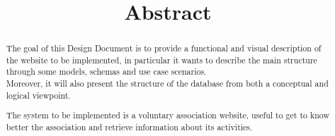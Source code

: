\documentclass[../DD.tex]{subfiles}
\begin{document}
\title{Abstract}
\begin{abstract}
	The goal of this Design Document is to provide a functional and visual description of the website to be implemented, in particular it wants to describe the main structure through some models, schemas and use case scenarios. \\
	Moreover, it will also present the structure of the database from both a conceptual and logical viewpoint.
	
	The system to be implemented is a voluntary association website, useful to get to know better the association and retrieve information about its activities.
\end{abstract}

\thispagestyle{fancy}
	\newpage
		
\end{document}
